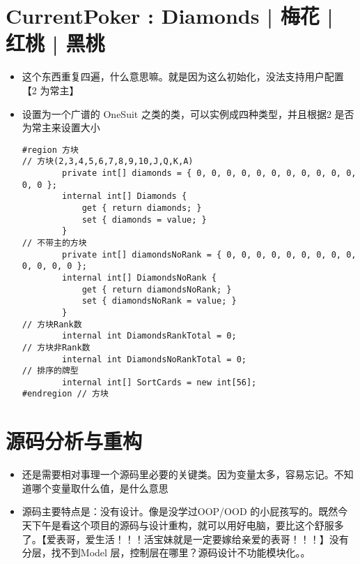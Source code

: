 \documentclass[9pt, b5paper]{article}
\begin{document}
\section{CurrentPoker : Diamonds | 梅花 | 红桃 | 黑桃}
\label{sec-2}
\begin{itemize}
\item 这个东西重复四遍，什么意思嘛。就是因为这么初始化，没法支持用户配置【2 为常主】
\item 设置为一个广谱的 OneSuit 之类的类，可以实例成四种类型，并且根据2 是否为常主来设置大小
\begin{verbatim}
#region 方块
// 方块(2,3,4,5,6,7,8,9,10,J,Q,K,A)
        private int[] diamonds = { 0, 0, 0, 0, 0, 0, 0, 0, 0, 0, 0, 0, 0 };
        internal int[] Diamonds {
            get { return diamonds; }
            set { diamonds = value; }
        }
// 不带主的方块
        private int[] diamondsNoRank = { 0, 0, 0, 0, 0, 0, 0, 0, 0, 0, 0, 0, 0 };
        internal int[] DiamondsNoRank {
            get { return diamondsNoRank; }
            set { diamondsNoRank = value; }
        }
// 方块Rank数
        internal int DiamondsRankTotal = 0;
// 方块非Rank数
        internal int DiamondsNoRankTotal = 0;
// 排序的牌型
        internal int[] SortCards = new int[56];
#endregion // 方块
\end{verbatim}
\end{itemize}

\section{源码分析与重构}
\label{sec-3}
\begin{itemize}
\item 还是需要相对事理一个源码里必要的关键类。因为变量太多，容易忘记。不知道哪个变量取什么值，是什么意思
\item 源码主要特点是：没有设计。像是没学过OOP/OOD 的小屁孩写的。既然今天下午是看这个项目的源码与设计重构，就可以用好电脑，要比这个舒服多了。【爱表哥，爱生活！！！活宝妹就是一定要嫁给亲爱的表哥！！！】没有分层，找不到Model 层，控制层在哪里？源码设计不功能模块化。。
\end{itemize}
\end{document}
